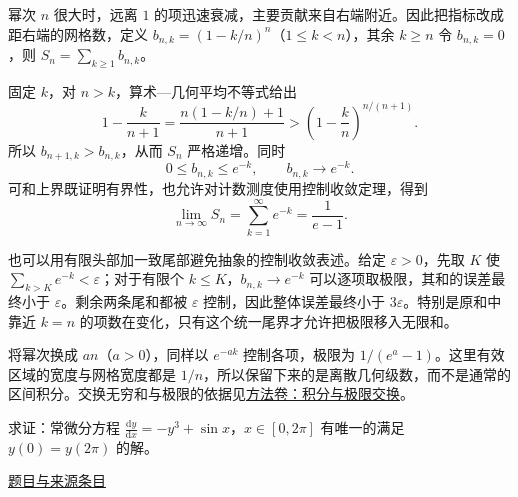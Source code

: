 \documentclass[UTF8,12pt,a4paper,fontset=fandol]{ctexart}
\begin{document}
\begin{solve}\label{ans:fin08-lo:8}

幂次 $n$ 很大时，远离 $1$ 的项迅速衰减，主要贡献来自右端附近。因此把指标改成距右端的网格数，定义 $b_{n,k}=(1-k/n)^n$（$1\leq k<n$），其余 $k\geq n$ 令 $b_{n,k}=0$，则 $S_n=\sum_{k\geq1}b_{n,k}$。

固定 $k$，对 $n>k$，算术---几何平均不等式给出
\[
1-\frac{k}{n+1}=\frac{n(1-k/n)+1}{n+1}>\left(1-\frac{k}{n}\right)^{n/(n+1)}.
\]
所以 $b_{n+1,k}>b_{n,k}$，从而 $S_n$ 严格递增。同时
\[
0\leq b_{n,k}\leq e^{-k},\qquad b_{n,k}\longrightarrow e^{-k}.
\]
可和上界既证明有界性，也允许对计数测度使用控制收敛定理，得到
\[
\lim_{n\to\infty}S_n=\sum_{k=1}^\infty e^{-k}=\frac1{e-1}.
\]

也可以用有限头部加一致尾部避免抽象的控制收敛表述。给定 $\varepsilon>0$，先取 $K$ 使 $\sum_{k>K}e^{-k}<\varepsilon$；对于有限个 $k\le K$，$b_{n,k}\to e^{-k}$ 可以逐项取极限，其和的误差最终小于 $\varepsilon$。剩余两条尾和都被 $\varepsilon$ 控制，因此整体误差最终小于 $3\varepsilon$。特别是原和中靠近 $k=n$ 的项数在变化，只有这个统一尾界才允许把极限移入无限和。

\end{solve}

\begin{remark}[方法与条件]将幂次换成 $an$（$a>0$），同样以 $e^{-ak}$ 控制各项，极限为 $1/(e^a-1)$。这里有效区域的宽度与网格宽度都是 $1/n$，所以保留下来的是离散几何级数，而不是通常的区间积分。交换无穷和与极限的依据见\hyperref[app:integration-exchange]{方法卷：积分与极限交换}。\end{remark}

\begin{example}\label{ex:fin08-lo:9}\label{pr:fin08-lo:9}

求证：常微分方程 $\frac{\mathrm{d}y}{\mathrm{d}x}=-y^{3}+\sin x$，$x\in[0,2\pi]$ 有唯一的满足 $y(0)=y(2\pi)$ 的解。

\par\href{https://github.com/lzxcr/cmc-mathematics/blob/64916fa1fdbc3e444a652eca204d5669058ee321/src/problems/finals/08/10.md}{题目与来源条目}

\end{example}
\end{document}
